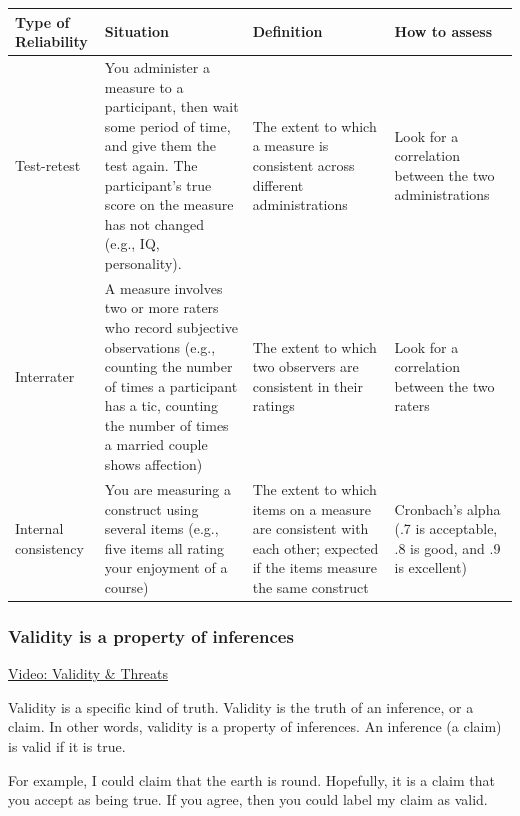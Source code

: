 \documentclass[
]{book}
\begin{document}
\begin{longtable}[]{@{}
  >{\raggedright\arraybackslash}p{}
  >{\raggedright\arraybackslash}p{}
  >{\raggedright\arraybackslash}p{}
  >{\raggedright\arraybackslash}p{}@{}}
\toprule
Type of Reliability & Situation & Definition & How to assess \\
\midrule
\endhead
Test-retest & You administer a measure to a participant, then wait some period of time, and give them the test again. The participant's true score on the measure has not changed (e.g., IQ, personality). & The extent to which a measure is consistent across different administrations & Look for a correlation between the two administrations \\
Interrater & A measure involves two or more raters who record subjective observations (e.g., counting the number of times a participant has a tic, counting the number of times a married couple shows affection) & The extent to which two observers are consistent in their ratings & Look for a correlation between the two raters \\
Internal consistency & You are measuring a construct using several items (e.g., five items all rating your enjoyment of a course) & The extent to which items on a measure are consistent with each other; expected if the items measure the same construct & Cronbach's alpha (.7 is acceptable, .8 is good, and .9 is excellent) \\
\bottomrule
\end{longtable}

\hypertarget{validity-is-a-property-of-inferences}{%
\subsubsection{Validity is a property of inferences}\label{validity-is-a-property-of-inferences}}

\href{https://youtu.be/mxZxGttf6sE}{Video: Validity \& Threats}

Validity is a specific kind of truth. Validity is the truth of an inference, or a claim. In other words, validity is a property of inferences. An inference (a claim) is valid if it is true.

For example, I could claim that the earth is round. Hopefully, it is a claim that you accept as being true. If you agree, then you could label my claim as valid.
\end{document}
